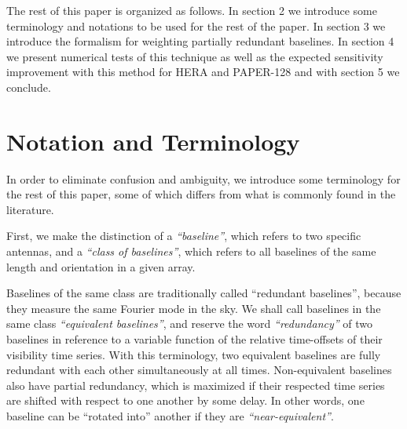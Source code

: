 \documentclass[twocolumn,apj,numberedappendix]{emulateapj}
\renewcommand\[{\begin{equation}}
\renewcommand\]{\end{equation}}
\begin{document}
The rest of this paper is organized as follows. In section 2 we introduce some terminology and notations to be used for the rest of the paper. In section
3 we introduce the formalism for weighting partially redundant baselines.
In section 4 we present numerical tests of
this technique as well as the expected sensitivity improvement
with this method for HERA and PAPER-128 and with section 5 we conclude. 

\section{Notation and Terminology}

In order to eliminate confusion and ambiguity, we
introduce some terminology for the rest of this paper, some of which differs from what is commonly found in the literature. 

First, we make the distinction of a \textit{``baseline''}, which refers to two specific antennas, and a \textit{``class of baselines''}, which refers to all baselines of the same length and orientation in a given array. 

Baselines of the same class are traditionally called
``redundant baselines'', because they measure the same Fourier mode
in the sky.  We shall call baselines in the same class \textit{``equivalent baselines''}, and reserve the word \textit{``redundancy''} of two baselines in reference to a variable function of the relative time-offsets of their visibility time series. With this terminology, two equivalent
baselines are fully redundant with each other simultaneously at all
times. Non-equivalent baselines also have partial redundancy, which is maximized if their
respected time series are shifted with respect to one another by some delay. In other words, one baseline can be ``rotated into''
another if they are \textit{``near-equivalent''}.
\end{document}
